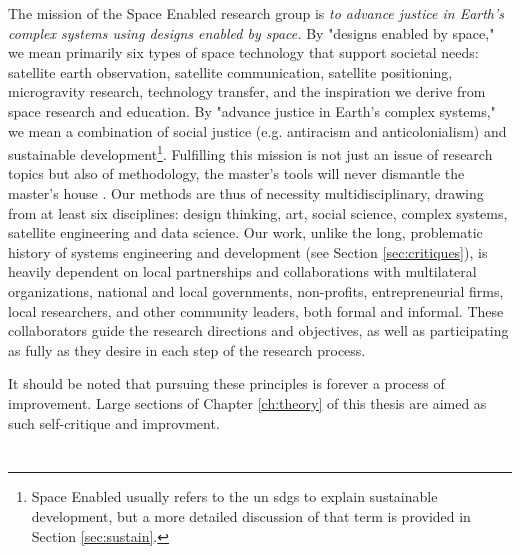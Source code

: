 The mission of the Space Enabled research group is \textit{to advance justice in Earth's complex systems using designs enabled by space.} By "designs enabled by space," we mean primarily six types of space technology that support societal needs: satellite earth observation, satellite communication, satellite positioning, microgravity research, technology transfer, and the inspiration we derive from space research and education. By "advance justice in Earth's complex systems," we mean a combination of social justice (e.g. antiracism and anticolonialism) and sustainable development\footnote{Space Enabled usually refers to the \ac{un} \acp{sdg} to explain sustainable development, but a more detailed discussion of that term is provided in Section \ref{sec:sustain}.}. Fulfilling this mission is not just an issue of research topics but also of methodology, the master's tools will never dismantle the master's house \cite{lordeMasterToolsWill1984}. Our methods are thus of necessity multidisciplinary, drawing from at least six disciplines: design thinking, art, social science, complex systems, satellite engineering and data science. Our work, unlike the long, problematic history of systems engineering and development (see Section \ref{sec:critiques}), is heavily dependent on local partnerships and collaborations with multilateral organizations, national and local governments, non-profits, entrepreneurial firms, local researchers, and other community leaders, both formal and informal. These collaborators guide the research directions and objectives, as well as participating as fully as they desire in each step of the research process.

It should be noted that pursuing these principles is forever a process of improvement. Large sections of Chapter \ref{ch:theory} of this thesis are aimed as such self-critique and improvment. 

\section{}

